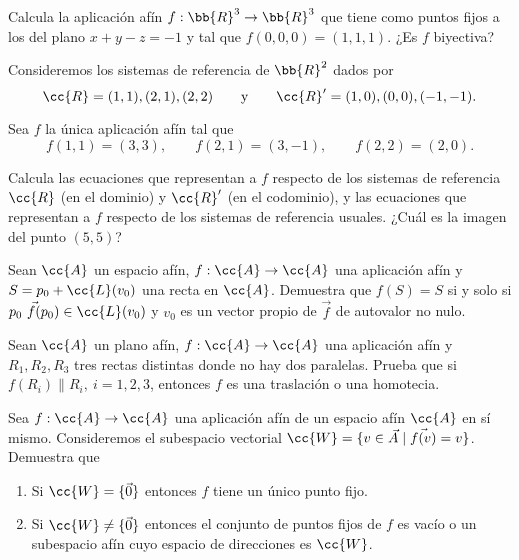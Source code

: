 \begin{ejercicio}
    Calcula la aplicación afín $f : \bb{R}^3 \to \bb{R}^3$ que tiene como puntos fijos a los del plano $x + y - z = -1$ y tal que $f (0, 0, 0) = (1, 1, 1)$. ¿Es $f$ biyectiva?
\end{ejercicio}

\begin{ejercicio}
    Consideremos los sistemas de referencia de $\bb{R}^2$ dados por
    \begin{equation*}
        \cc{R} = {(1, 1), (2, 1), (2, 2)}
        \qquad \text{y} \qquad
        \cc{R}' = {(1, 0), (0, 0), (-1, -1)}.
    \end{equation*}

    Sea $f$ la única aplicación afín tal que
    \begin{equation*}
        f (1, 1) = (3, 3),\qquad f (2, 1) = (3, -1),\qquad f (2, 2) = (2, 0).
    \end{equation*}

    Calcula las ecuaciones que representan a $f$ respecto de los sistemas de referencia $\cc{R}$ (en el dominio) y $\cc{R}'$ (en el codominio), y las ecuaciones que representan a $f$ respecto de los sistemas de referencia usuales. ¿Cuál es la imagen del punto $(5, 5)$?
\end{ejercicio}


\begin{ejercicio}
    Sean $\cc{A}$ un espacio afín, $f : \cc{A} \to \cc{A}$ una aplicación afín y $S = p_0 + \cc{L}(v_0)$ una recta en $\cc{A}$. Demuestra que $f(S) = S$ si y solo si $\vec{p_0~f(p_0)} \in \cc{L}(v_0)$ y $v_0$ es un vector propio de $\vec{f}$ de autovalor no nulo.
\end{ejercicio}


\begin{ejercicio}
    Sean $\cc{A}$ un plano afín, $f : \cc{A} \to \cc{A}$ una aplicación afín y ${R}_1, {R}_2, {R}_3$ tres rectas distintas donde no hay dos paralelas. Prueba que si $f(R_i) \| R_i,~i = 1, 2, 3$, entonces $f$ es una traslación o una homotecia.
\end{ejercicio}

\begin{ejercicio}
    Sea $f : \cc{A} \to \cc{A}$ una aplicación afín de un espacio afín  $\cc{A}$ en sí mismo. Consideremos el subespacio vectorial $\cc{W} = \{v \in \vec{A} \mid \vec{f(v)} = v\}$. Demuestra que
    \begin{enumerate}
        \item Si $\cc{W} = \{\vec{0}\}$ entonces $f$ tiene un único punto fijo.
        \item Si $\cc{W} \neq \{\vec{0}\}$ entonces el conjunto de puntos fijos de $f$ es vacío o un subespacio afín cuyo espacio de direcciones es $\cc{W}$.
    \end{enumerate}
\end{ejercicio}

